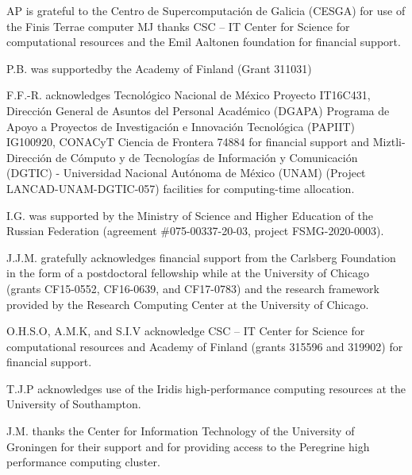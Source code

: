 \documentclass[aps,prl,superscriptaddress,twocolumn]{revtex4}
\begin{document}
\begin{acknowledgments}
AP is grateful to the Centro de
Supercomputación de Galicia (CESGA) for use of the Finis
Terrae computer
%
MJ thanks CSC -- IT Center for Science for computational resources and the Emil Aaltonen foundation for financial support.


P.B. was supportedby the Academy of Finland (Grant 311031)

F.F.-R. acknowledges Tecnol\'{o}gico Nacional de M\'{e}xico Proyecto IT16C431, Direcci\'{o}n General de Asuntos del Personal Acad\'{e}mico (DGAPA) Programa de Apoyo a Proyectos de Investigaci\'{o}n e Innovaci\'{o}n Tecnol\'{o}gica (PAPIIT) IG100920, CONACyT Ciencia de Frontera 74884 for financial support and Miztli-Direcci\'{o}n de C\'{o}mputo y de Tecnolog\'{i}as de Informaci\'{o}n y Comunicaci\'{o}n (DGTIC) - Universidad Nacional Aut\'{o}noma de M{\'e}xico (UNAM) (Project LANCAD-UNAM-DGTIC-057) facilities for computing-time allocation.

I.G. was supported by the Ministry of Science and Higher Education of the Russian Federation (agreement \#075-00337-20-03, project FSMG-2020-0003). 

J.J.M. gratefully acknowledges financial support from the Carlsberg 
Foundation in the form of a postdoctoral fellowship while at 
the University of Chicago (grants CF15-0552, CF16-0639, and 
CF17-0783) and the research framework provided by the 
Research Computing Center at the University of Chicago.

O.H.S.O, A.M.K, and S.I.V acknowledge CSC -- IT Center for Science for computational resources and Academy of Finland (grants 315596 and 319902) for financial support.

T.J.P acknowledges use of the Iridis high-performance computing resources at the University of Southampton.

J.M. thanks the Center for Information Technology of the University of Groningen for their support and for providing access to the Peregrine high performance computing cluster.

\end{acknowledgments}





\end{document}
